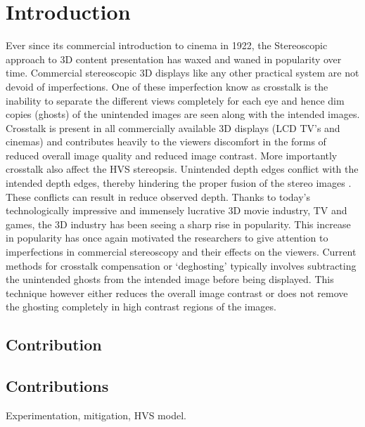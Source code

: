 \chapter{Introduction}
\label{chap:intro}

Ever since its commercial introduction to cinema in 1922, the Stereoscopic approach to 3D content presentation has waxed and waned in popularity over time. Commercial stereoscopic 3D displays like any other practical system are not devoid of imperfections. One of these imperfection know as crosstalk is the inability to separate the different views completely for each eye and hence dim copies (ghosts) of the unintended images are seen along with the intended images. Crosstalk is present in all commercially available 3D displays (LCD TV's and cinemas) and contributes heavily to the viewers discomfort in the forms of reduced overall image quality and reduced image contrast. More importantly crosstalk also affect the HVS stereopsis. Unintended depth edges conflict with the intended depth edges, thereby hindering the proper fusion of the stereo images \cite{tsirlin2012effect}. These conflicts can result in reduce observed depth. Thanks to today's technologically impressive and immensely lucrative 3D movie industry, TV and games, the 3D industry has been seeing a sharp rise in popularity. This increase in popularity has once again motivated the researchers to give attention to imperfections in commercial stereoscopy and their effects on the viewers. Current methods for crosstalk compensation or `deghosting' typically involves subtracting the unintended ghosts from the intended image before being displayed. This technique however either reduces the overall image contrast or does not remove the ghosting completely in high contrast regions of the images.

\section{Contribution}



\section{Contributions}
Experimentation, mitigation, HVS model.



